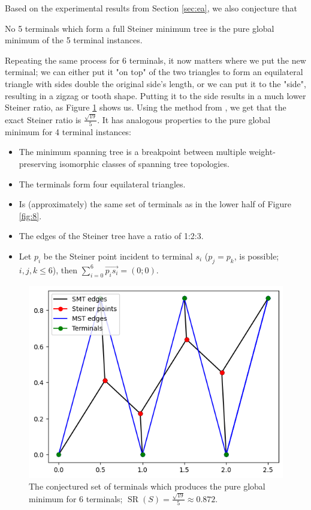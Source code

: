 \documentclass{mpaper}
\begin{document}
Based on the experimental results from Section \ref{sec:ea}, we also conjecture that
\begin{conjecture}
  No 5 terminals which form a full Steiner minimum tree is the pure global minimum of the 5 terminal instances.
\end{conjecture}

Repeating the same process for 6 terminals, it now matters where we put the new terminal; we can either put it "on top" of the two triangles to form an equilateral triangle with sides double the original side's length, or we can put it to the "side", resulting in a zigzag or tooth shape. Putting it to the side results in a much lower Steiner ratio, as Figure \ref{fig:14} shows us. Using the method from \cite{uteshev2021length}, we get that the exact Steiner ratio is $\frac{\sqrt{19}}{5}$. It has analogous properties to the pure global minimum for 4 terminal instances:

\begin{itemize}
  \item The minimum spanning tree is a breakpoint between multiple weight-preserving isomorphic classes of spanning tree topologies. %
  \item The terminals form four equilateral triangles.
  \item Is (approximately) the same set of terminals as in the lower half of Figure \ref{fig:8}.
  \item The edges of the Steiner tree have a ratio of 1:2:3.
  \item Let $p_i$ be the Steiner point incident to terminal $s_i$ ($p_j=p_k$, is possible; $i,j,k \leq 6$), then $\sum\limits_{i=0}^6\overrightarrow{p_is_i}=(0;0)$. 
\end{itemize}


\begin{figure}[h!]
  \begin{center}
  \includegraphics[scale=0.5]{plot13.png}
  \end{center}
  \caption{\label{fig:14} The conjectured set of terminals which produces the pure global minimum for 6 terminals; $\operatorname{SR}(S) = \frac{\sqrt{19}}{5}\approx 0.872$.}
\end{figure}
\end{document}
